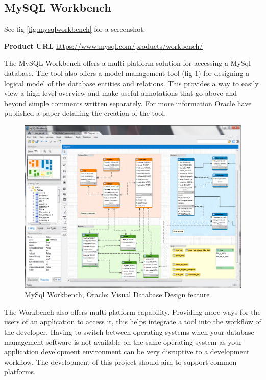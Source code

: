 \subsection{MySQL Workbench}\label{mysql-workbench}

\noindent
See fig \ref{fig:mysqlworkbench} for a screenshot.

\noindent
\textbf{Product URL}\cite{mysqlworkbench}
\url{https://www.mysql.com/products/workbench/}


The MySQL Workbench offers a multi-platform solution for accessing a MySql
database. The tool also offers a model management tool (fig
\ref{fig:mysqlworkbenchmodel}) for designing a logical model of the database
entities and relations. This provides a way to easily view a high level
overview and make useful annotations that go above and beyond simple comments
written separately. For more information Oracle have published a paper
detailing the creation of the tool\cite{mysqlworkbenchmodeldesign}.

\begin{figure}
  \includegraphics[width=\linewidth]{Figures/MySqlWorkbenchModel.png}
  \caption{MySql Workbench, Oracle: Visual Database Design feature}
  \label{fig:mysqlworkbenchmodel}
\end{figure}

The Workbench also offers multi-platform capability. Providing more ways for the
users of an application to access it, this helps integrate a tool into the 
workflow of the developer. Having to switch between operating systems when your database
management software is not available on the same operating system as your application
development environment can be very disruptive to a development workflow. The
development of this project should aim to support common platforms.



